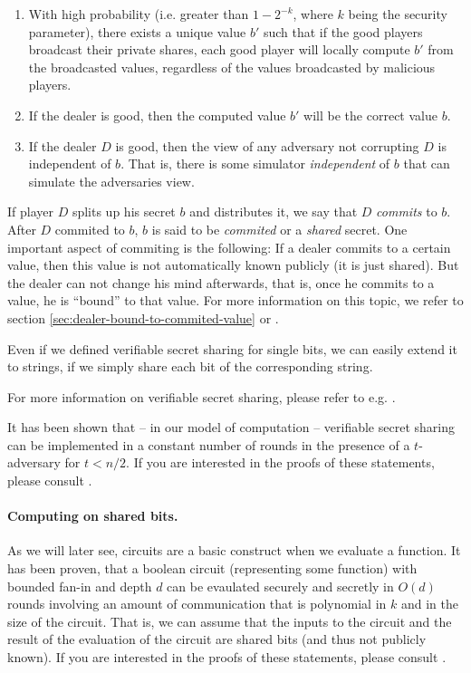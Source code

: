 \message{ !name(seminar.tex)}\documentclass{llncs}
\begin{document}
\begin{enumerate}
\item With high probability (i.e. greater than $1-2^{-k}$, where $k$ being the security parameter), there exists a unique value $b'$ such that if the good players broadcast their private shares, each good player will locally compute $b'$ from the broadcasted values, regardless of the values broadcasted by malicious players.
\item If the dealer is good, then the computed value $b'$ will be the correct value $b$.
\item If the dealer $D$ is good, then the view of any adversary not corrupting $D$ is independent of $b$. That is, there is some simulator \emph{independent} of $b$ that can simulate the adversaries view.
\end{enumerate}

If player $D$ splits up his secret $b$ and distributes it, we say that $D$ \emph{commits} to $b$. After $D$ commited to $b$, $b$ is said to be \emph{commited} or a \emph{shared} secret. One important aspect of commiting is the following: If a dealer commits to a certain value, then this value is not automatically known publicly (it is just shared). But the dealer can not change his mind afterwards, that is, once he commits to a value, he is ``bound'' to that value. For more information on this topic, we refer to section \ref{sec:dealer-bound-to-commited-value} or \cite{lecture-notes-goldwasser-bellare}.

Even if we defined verifiable secret sharing for single bits, we can easily extend it to strings, if we simply share each bit of the corresponding string.

For more information on verifiable secret sharing, please refer to e.g. \cite{verifiable-secret-sharing-chor-ben-gold-sha-mic}.

It has been shown that -- in our model of computation -- verifiable secret sharing can be implemented in a constant number of rounds in the presence of a $t$-adversary for $t<n/2$. If you are interested in the proofs of these statements, please consult \cite{rabin-ben-or-verifiable-secret-sharing-number-rounds,beaver-verifiable-secret-sharing}. 

\paragraph{Computing on shared bits.}

As we will later see, circuits are a basic construct when we evaluate a function. It has been proven, that a boolean circuit (representing some function) with bounded fan-in and depth $d$ can be evaulated securely and secretly in $O(d)$ rounds involving an amount of communication that is polynomial in $k$ and in the size of the circuit. That is, we can assume that the inputs to the circuit and the result of the evaluation of the circuit are shared bits (and thus not publicly known). If you are interested in the proofs of these statements, please consult \cite{rabin-ben-or-verifiable-secret-sharing-number-rounds,beaver-verifiable-secret-sharing,how-to-play-any-mental-game-goldreich-micali-wigderson}.
\end{document}
